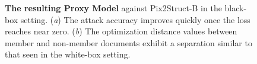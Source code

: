 \begin{figure}[h]
    \centering
\caption{\textbf{The resulting Proxy Model} against Pix2Struct-B in the black-box setting. (\textit{a}) The attack accuracy improves quickly once the loss reaches near zero. (\textit{b}) The optimization distance values between member and non-member documents exhibit a separation similar to that seen in the white-box setting.}
\label{fig:proxy_model}
\end{figure}

